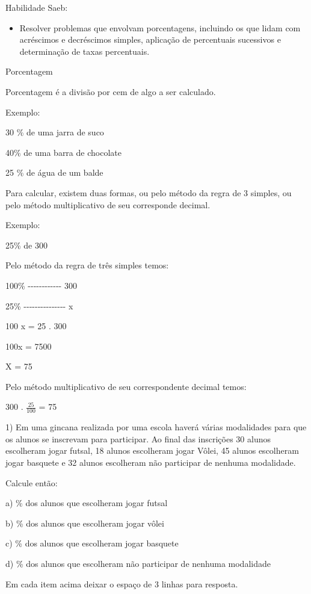 Habilidade Saeb:

\begin{itemize}
\tightlist
\item
  Resolver problemas que envolvam porcentagens, incluindo os que lidam
  com acréscimos e decréscimos simples, aplicação de percentuais
  sucessivos e determinação de taxas percentuais.
\end{itemize}

Porcentagem

Porcentagem é a divisão por cem de algo a ser calculado.

Exemplo:

30 \% de uma jarra de suco

40\% de uma barra de chocolate

25 \% de água de um balde

Para calcular, existem duas formas, ou pelo método da regra de 3
simples, ou pelo método multiplicativo de seu corresponde decimal.

Exemplo:

25\% de 300

Pelo método da regra de três simples temos:

100\% -\/-\/-\/-\/-\/-\/-\/-\/-\/-\/-\/- 300

25\% -\/-\/-\/-\/-\/-\/-\/-\/-\/-\/-\/-\/-\/-\/- x

100 x = 25 . 300

100x = 7500

X = 75

Pelo método multiplicativo de seu correspondente decimal temos:

300 . \(\frac{25}{100}\) = 75


1) Em uma gincana realizada por uma escola haverá várias modalidades
para que os alunos se inscrevam para participar. Ao final das inscrições
30 alunos escolheram jogar futsal, 18 alunos escolheram jogar Vôlei, 45
alunos escolheram jogar basquete e 32 alunos escolheram não participar
de nenhuma modalidade.

Calcule então:

a) \% dos alunos que escolheram jogar futsal

b) \% dos alunos que escolheram jogar vôlei

c) \% dos alunos que escolheram jogar basquete

d) \% dos alunos que escolheram não participar de nenhuma modalidade

Em cada item acima deixar o espaço de 3 linhas para resposta.

